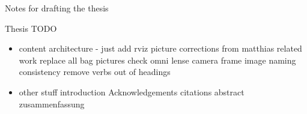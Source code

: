 \clearemptydoublepage

{}

\begin{center}
	\huge{Notes for drafting the thesis}
\end{center}


Thesis TODO
\begin{itemize}
\item content
\subitem architecture - just add rviz picture
\subitem corrections from matthias
\subitem related work
\subitem replace all bag pictures
\subitem check omni lense camera frame image naming consistency
\subitem remove verbs out of headings
\item other stuff
\subitem introduction
\subitem Acknowledgements
\subitem citations
\subitem abstract
\subitem zusammenfassung
\end{itemize}
